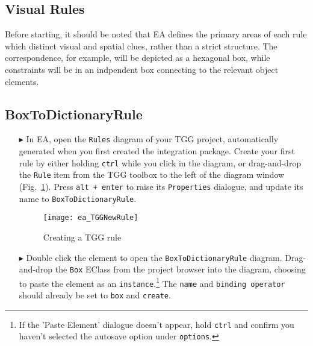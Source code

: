 \newpage
\hypertarget{rules vis}{}
\subsection{Visual Rules}
\visHeader

Before starting, it should be noted that EA defines the primary areas of each rule which distinct visual and spatial clues, rather than a strict structure. The
correspondence, for example, will be depicted as a hexagonal box, while constraints will be in an indpendent box connecting to the relevant object elements.

\subsection{BoxToDictionaryRule}

\begin{enumerate}

\item[$\blacktriangleright$] In EA, open the \texttt{Rules} diagram of your TGG project, automatically generated when you first created the integration package.
Create your first rule by either holding \texttt{ctrl} while you click in the diagram, or drag-and-drop the \texttt{Rule} item from the TGG toolbox to the left
of the diagram window (Fig.~\ref{fig:create_tgg_rule}). Press \texttt{alt + enter} to raise its \texttt{Properties} dialogue, and update its name to
\texttt{BoxToDictionaryRule}.

\vspace{0.5cm}

\begin{figure}[htbp]
\begin{center}
  \texttt{[image: ea\_TGGNewRule]}
  \caption{Creating a TGG rule}
  \label{fig:create_tgg_rule}
\end{center}
\end{figure}

\item[$\blacktriangleright$] Double click the element to open the \texttt{BoxToDictionaryRule} diagram. Drag-and-drop the \texttt{Box} EClass from the project
browser into the diagram, choosing to paste the element as an \texttt{instance}.\footnote{If the 'Paste Element' dialogue doesn't appear, hold \texttt{ctrl} and
confirm you haven't selected the autosave option under \texttt{options}.} The \texttt{name} and \texttt{binding operator} should already be set to \texttt{box}
and \texttt{create}.


\end{enumerate}
